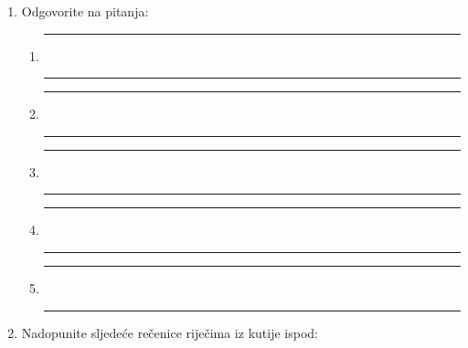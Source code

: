\documentclass[a5paper, 10pt]{tekst}
\begin{document}
\begin{enumerate}
		\item Odgovorite na pitanja:
		\begin{enumerate}[label=(\roman*)]
			\raggedright
			\item\vspace{0.5em}
			\rule{\linewidth}{0.5pt}\\[0.6em]
			\rule{\linewidth}{0.5pt}
			\item\vspace{0.5em}
			\rule{\linewidth}{0.5pt}\\[0.6em]
			\rule{\linewidth}{0.5pt}
			\item\vspace{0.5em}
			\rule{\linewidth}{0.5pt}\\[0.6em]
			\rule{\linewidth}{0.5pt}
			\item\vspace{0.5em}
			\rule{\linewidth}{0.5pt}\\[0.6em]
			\rule{\linewidth}{0.5pt}
			\item\vspace{0.5em}
			\rule{\linewidth}{0.5pt}\\[0.6em]
			\rule{\linewidth}{0.5pt}
		\end{enumerate}		
		\item Nadopunite sljedeće rečenice riječima iz kutije ispod:
		\begin{center}
		\end{center}
		\begin{enumerate}[label=(\roman*)]
			\raggedright
			

\end{enumerate}
\end{enumerate}
\end{document}
